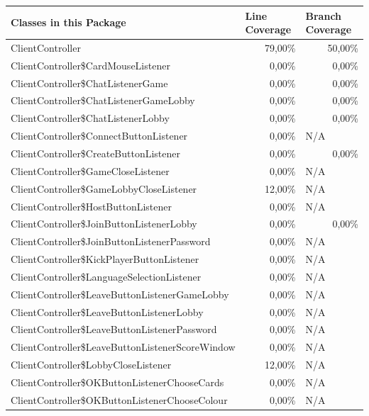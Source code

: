 \documentclass[a4paper]{article}
\begin{document}
	\noindent	
\begin{tabular}{|l|r|l|}
\hline
Classes in this Package & \multicolumn{1}{l|}{Line Coverage} & Branch Coverage \\ \hline \hline
ClientController & 79,00\% & \multicolumn{1}{r|}{50,00\%} \\ \hline
ClientController\$CardMouseListener & 0,00\% & \multicolumn{1}{r|}{0,00\%} \\ \hline
ClientController\$ChatListenerGame & 0,00\% & \multicolumn{1}{r|}{0,00\%} \\ \hline
ClientController\$ChatListenerGameLobby & 0,00\% & \multicolumn{1}{r|}{0,00\%} \\ \hline
ClientController\$ChatListenerLobby & 0,00\% & \multicolumn{1}{r|}{0,00\%} \\ \hline
ClientController\$ConnectButtonListener & 0,00\% & N/A \\ \hline
ClientController\$CreateButtonListener & 0,00\% & \multicolumn{1}{r|}{0,00\%} \\ \hline
ClientController\$GameCloseListener & 0,00\% & N/A \\ \hline
ClientController\$GameLobbyCloseListener & 12,00\% & N/A \\ \hline
ClientController\$HostButtonListener & 0,00\% & N/A \\ \hline
ClientController\$JoinButtonListenerLobby & 0,00\% & \multicolumn{1}{r|}{0,00\%} \\ \hline
ClientController\$JoinButtonListenerPassword & 0,00\% & N/A \\ \hline
ClientController\$KickPlayerButtonListener & 0,00\% & N/A \\ \hline
ClientController\$LanguageSelectionListener & 0,00\% & N/A \\ \hline
ClientController\$LeaveButtonListenerGameLobby & 0,00\% & N/A \\ \hline
ClientController\$LeaveButtonListenerLobby & 0,00\% & N/A \\ \hline
ClientController\$LeaveButtonListenerPassword & 0,00\% & N/A \\ \hline
ClientController\$LeaveButtonListenerScoreWindow & 0,00\% & N/A \\ \hline
ClientController\$LobbyCloseListener & 12,00\% & N/A \\ \hline
ClientController\$OKButtonListenerChooseCards & 0,00\% & N/A \\ \hline
ClientController\$OKButtonListenerChooseColour & 0,00\% & N/A \\ \hline

\end{tabular}
\end{document}
